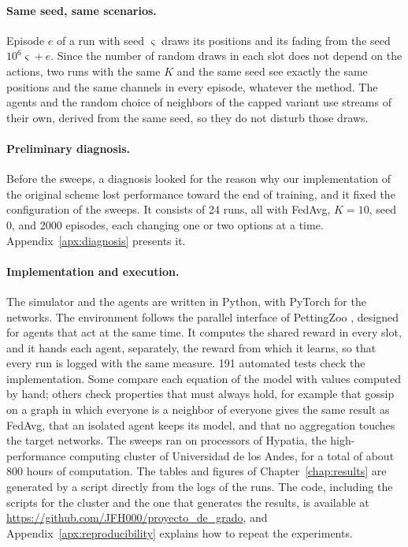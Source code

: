 \paragraph{Same seed, same scenarios.} Episode $e$ of a run with seed $\varsigma$ draws its positions and its
fading from the seed $10^6 \varsigma + e$. Since the number of random draws in each slot does not depend on the
actions, two runs with the same $K$ and the same seed see exactly the same positions and the same channels in
every episode, whatever the method. The agents and the random choice of neighbors of the capped variant use
streams of their own, derived from the same seed, so they do not disturb those draws.

\paragraph{Preliminary diagnosis.} Before the sweeps, a diagnosis looked for the reason why our implementation
of the original scheme lost performance toward the end of training, and it fixed the configuration of the
sweeps. It consists of 24 runs, all with \ac{FedAvg}, $K = 10$, seed 0, and 2000 episodes, each changing one
or two options at a time. Appendix~\ref{apx:diagnosis} presents it.

\paragraph{Implementation and execution.} The simulator and the agents are written in Python, with PyTorch
\cite{paszke+19pytorch} for the networks. The environment follows the parallel interface of PettingZoo
\cite{terry+21pettingzoo}, designed for agents that act at the same time. It computes the shared reward in
every slot, and it hands each agent, separately, the reward from which it learns, so that every run is
logged with the same measure. 191 automated tests check the implementation. Some compare each equation of the
model with values computed by hand; others check properties that must always hold, for example that gossip
on a graph in which everyone is a neighbor of everyone gives the same result as \ac{FedAvg}, that an isolated
agent keeps its model, and that no aggregation touches the target networks. The sweeps ran on processors of
Hypatia, the high-performance computing cluster of Universidad de los Andes, for a total of about 800 hours
of computation. The tables and figures of Chapter~\ref{chap:results} are generated by a script directly from
the logs of the runs. The code, including the scripts for the cluster and the one that generates the results,
is available at \url{https://github.com/JFH000/proyecto_de_grado}, and Appendix~\ref{apx:reproducibility}
explains how to repeat the experiments.

